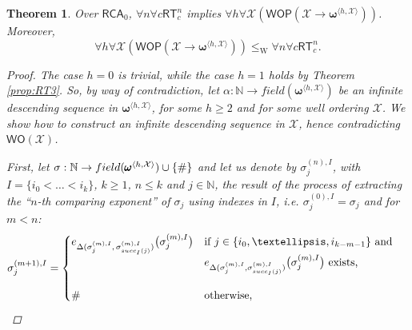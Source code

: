 \documentclass{amsart}
\newcommand\Nat{\mathbb{N}}
\newcommand\RCA{\mathsf{RCA}}
\newcommand\RT{\mathsf{RT}}
\newcommand\WO{\mathsf{WO}}
\newcommand\WOP{\mathsf{WOP}}
\newcommand\W{\mathrm{W}}
\newcommand{\LoX}{\mathcal{X}}
\newcommand\boldomega{\pmb{\omega}}
\newcommand\additionalsymbol{\text{\small{\#}}}
\newtheorem{theorem}{Theorem}
\begin{document}
\begin{theorem}\label{prop:RTn}
Over $\RCA_0$, $\forall n \forall c \RT^n_c$ implies $\forall h \forall \LoX (\WOP(\LoX \rightarrow \boldomega^{\langle h,\LoX \rangle}))$. Moreover, 
$$\forall h \forall \LoX (\WOP(\LoX \rightarrow \boldomega^{\langle h,\LoX \rangle})) \leq_\W \forall n \forall c \RT^n_c.$$

\begin{proof}
The case $h=0$ is trivial, while the case $h=1$ holds by Theorem \ref{prop:RT3}. 
So, by way of contradiction, let $\alpha : \Nat \rightarrow field(\boldomega^{\langle h, \LoX \rangle})$ be an infinite descending sequence in $\boldomega^{\langle h, \LoX \rangle}$, for some $h \!\geq\! 2$ and for some well ordering $\LoX$. We show how to construct an infinite descending sequence in $\LoX$, hence contradicting $\WO(\LoX)$.

First, let $\sigma: \Nat \to field(\boldomega^{\langle h, \LoX \rangle}) \cup \{\additionalsymbol\}$ and let us denote by $\sigma_j^{(n),I}$, with $I = \{i_0 < \ldots < i_k\}$, $k \geq 1$, $n \leq k$ and $j \in \Nat$, the result of the process of extracting the ``$n$-th comparing exponent'' of $\sigma_j$ using indexes in $I$, i.e. $\sigma_j^{(0),I} = \sigma_j$ and for $m<n$:
\medskip
\begin{equation*}
\begin{split}
&\sigma_j^{(m+1),I} =
\begin{cases}
e_{\Delta(\sigma_j^{(m),I},\,\sigma_{succ_I(j)}^{(m),I})}\big(\sigma_j^{(m),I}\big)& \text{if }j \in\{i_0,\ldots,i_{k-m-1}\} \text{ and } \\& e_{\Delta(\sigma_j^{(m),I},\sigma_{succ_I(j)}^{(m),I})}\big(\sigma_j^{(m),I}\big) \text{ exists,}\\[16pt]
\additionalsymbol& \text{otherwise,}
\end{cases}
\end{split}
\end{equation*}

\smallskip


\end{proof}
\end{theorem}
\end{document}
